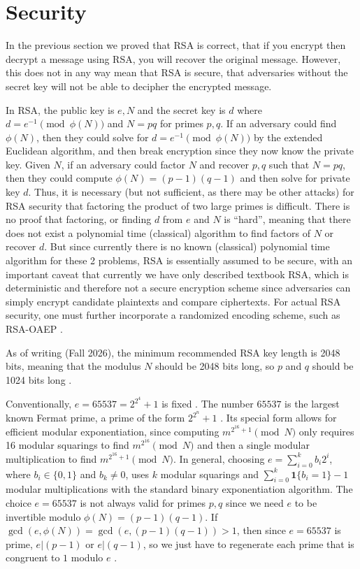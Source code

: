 \documentclass[12pt, letterpaper]{article}
\theoremstyle{definition}
\begin{document}
\section{Security} \label{sec_security}
In the previous section we proved that RSA is correct, that if you encrypt then decrypt a message
using RSA, you will recover the original message.
However, this does not in any way mean that RSA is secure, that adversaries
without the secret key will not be able to decipher the encrypted message.

In RSA, the public key is $e, N$ and the secret key is $d$ where $d = e^{-1} \pmod{\phi(N)}$
and $N = pq$ for primes $p, q$.
If an adversary could find $\phi(N)$, then they could solve for $d = e^{-1} \pmod{\phi(N)}$ by
the extended Euclidean algorithm, and then break encryption since they now know the private key.
Given $N$, if an adversary could factor $N$ and recover $p, q$ such that $N = pq$, then
they could compute $\phi(N) = (p-1)(q-1)$ and then solve for private key $d$.
Thus, it is necessary (but not sufficient, as there may be other attacks)
for RSA security that factoring the product of two large primes is difficult.
There is no proof that factoring, or finding $d$ from $e$ and $N$ is ``hard'', meaning
that there does not exist a polynomial time (classical) algorithm to find factors of
$N$ or recover $d$.
But since currently there is no known (classical) polynomial time algorithm for these 2 problems,
RSA is essentially assumed to be secure, with an important caveat that currently we have only
described textbook RSA, which is deterministic and therefore not a secure encryption scheme since
adversaries can simply encrypt candidate plaintexts and compare ciphertexts. For actual RSA
security, one must further incorporate a randomized encoding scheme, such as RSA-OAEP \cite{oaep}.

As of writing (Fall 2026), the minimum recommended RSA key length is 2048 bits,
meaning that the modulus $N$ should be 2048 bits long, so $p$ and $q$ should be
1024 bits long \cite{rsa}.

Conventionally, $e = 65537 = 2^{2^4} + 1$ is fixed \cite{rsa}. The number $65537$ is
the largest known Fermat prime, a prime of the form $2^{2^n} + 1$ \cite{fermat_prime}.
Its special form allows for efficient modular exponentiation, since computing
$m^{2^{16}+1} \pmod N$ only requires 16 modular squarings to find $m^{2^{16}} \pmod N$
and then a single modular multiplication to find $m^{2^{16} + 1} \pmod N$.
In general, choosing $e = \sum_{i=0}^k b_i 2^i$, where $b_i \in \{0,1\}$ and $b_k \ne 0$, uses $k$
modular squarings and $\sum_{i=0}^k \textbf{1}\{b_i = 1\} - 1$ modular multiplications
with the standard binary exponentiation algorithm.
The choice $e = 65537$ is not always valid for primes $p, q$ since we need $e$ to be invertible
modulo $\phi(N) = (p-1)(q-1)$. If $\gcd(e, \phi(N)) = \gcd(e, (p-1)(q-1)) > 1$, then since
$e = 65537$ is prime, $e|(p-1)$ or $e|(q-1)$, so we just have to regenerate each prime that is congruent
to $1$ modulo $e$ \cite{e_65537}.
\end{document}
